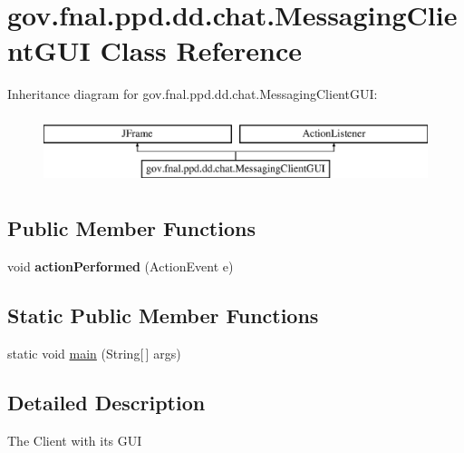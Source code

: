 \hypertarget{classgov_1_1fnal_1_1ppd_1_1dd_1_1chat_1_1MessagingClientGUI}{\section{gov.\-fnal.\-ppd.\-dd.\-chat.\-Messaging\-Client\-G\-U\-I Class Reference}
\label{classgov_1_1fnal_1_1ppd_1_1dd_1_1chat_1_1MessagingClientGUI}
}
Inheritance diagram for gov.\-fnal.\-ppd.\-dd.\-chat.\-Messaging\-Client\-G\-U\-I\-:\begin{figure}[H]
\begin{center}
\leavevmode
\includegraphics[height=2.000000cm]{classgov_1_1fnal_1_1ppd_1_1dd_1_1chat_1_1MessagingClientGUI}
\end{center}
\end{figure}
\subsection*{Public Member Functions}
\begin{DoxyCompactItemize}
\item 
\hypertarget{classgov_1_1fnal_1_1ppd_1_1dd_1_1chat_1_1MessagingClientGUI_a5b1a28bbc7f3f3bcdd00cc219a4a6486}{void {\bfseries action\-Performed} (Action\-Event e)}\label{classgov_1_1fnal_1_1ppd_1_1dd_1_1chat_1_1MessagingClientGUI_a5b1a28bbc7f3f3bcdd00cc219a4a6486}

\end{DoxyCompactItemize}
\subsection*{Static Public Member Functions}
\begin{DoxyCompactItemize}
\item 
static void \hyperlink{classgov_1_1fnal_1_1ppd_1_1dd_1_1chat_1_1MessagingClientGUI_ac6a16db13da46b43cdbffbf7437f90bc}{main} (String\mbox{[}$\,$\mbox{]} args)
\end{DoxyCompactItemize}


\subsection{Detailed Description}
The Client with its G\-U\-I


